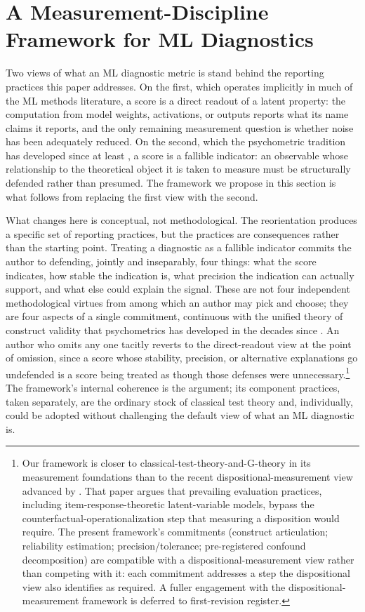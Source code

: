 \documentclass[10pt]{article}
\begin{document}
\section{A Measurement-Discipline Framework for ML Diagnostics}
\label{sec:framework}

Two views of what an ML diagnostic metric is stand behind the
reporting practices this paper addresses. On the first, which
operates implicitly in much of the ML methods literature, a score is
a direct readout of a latent property: the computation from model
weights, activations, or outputs reports what its name claims it
reports, and the only remaining measurement question is whether
noise has been adequately reduced. On the second, which the
psychometric tradition has developed since at least
\citet{cronbachmeehl1955}, a score is a fallible indicator: an
observable whose relationship to the theoretical object it is taken
to measure must be structurally defended rather than presumed. The
framework we propose in this section is what follows from replacing
the first view with the second.

What changes here is conceptual, not methodological. The
reorientation produces a specific set of reporting practices, but
the practices are consequences rather than the starting point. Treating a diagnostic as a fallible indicator
commits the author to defending, jointly and inseparably, four
things: what the score indicates, how stable the indication is, what
precision the indication can actually support, and what else could
explain the signal. These are not four independent methodological
virtues from among which an author may pick and choose; they are
four aspects of a single commitment, continuous with the unified
theory of construct validity
\citep{messick1989validity,messick1995validity} that psychometrics
has developed in the decades since \citet{cronbachmeehl1955}. An
author who omits any one tacitly reverts to the direct-readout view
at the point of omission, since a score whose stability, precision,
or alternative explanations go undefended is a score being treated
as though those defenses were unnecessary.\footnote{Our framework
is closer to classical-test-theory-and-G-theory in its measurement
foundations than to the recent dispositional-measurement view
advanced by \citet{voudouris2026measurementscience}. That paper
argues that prevailing evaluation practices, including
item-response-theoretic latent-variable models, bypass the
counterfactual-operationalization step that measuring a disposition
would require. The present framework's commitments (construct
articulation; reliability estimation; precision/tolerance;
pre-registered confound decomposition) are compatible with a
dispositional-measurement view rather than competing with it: each
commitment addresses a step the dispositional view also identifies
as required. A fuller engagement with the dispositional-measurement
framework is deferred to first-revision register.} The framework's
internal coherence is the argument; its component practices, taken
separately, are the ordinary stock of classical test theory and,
individually, could be adopted without challenging the default view
of what an ML diagnostic is.
\end{document}
